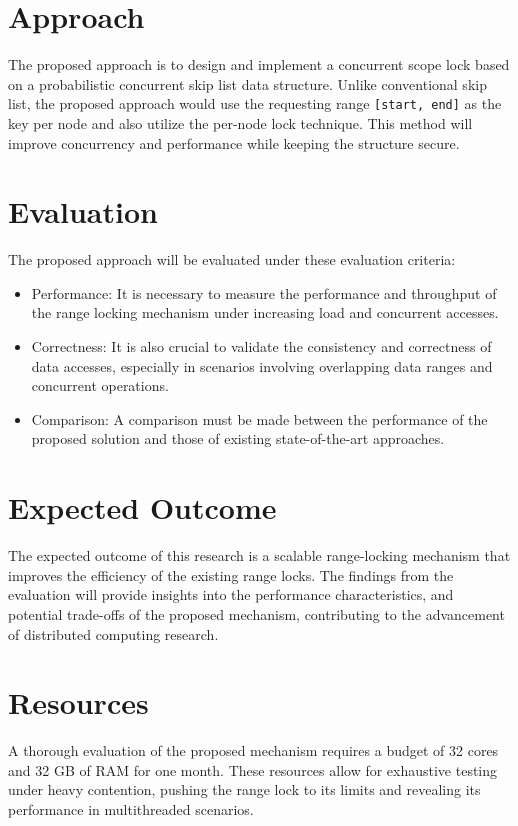 \section{Approach}
The proposed approach is to design and implement a concurrent scope lock based on a probabilistic concurrent skip list data structure. Unlike conventional skip list, the proposed approach would use the requesting range \texttt{[start, end]} as the key per node and also utilize the per-node lock technique. This method will improve concurrency and performance while keeping the structure secure.

\section{Evaluation}
The proposed approach will be evaluated under these evaluation criteria:
\begin{itemize}
    \item Performance: It is necessary to measure the performance and throughput of the range locking mechanism under increasing load and concurrent accesses.
    \item Correctness: It is also crucial to validate the consistency and correctness of data accesses, especially in scenarios involving overlapping data ranges and concurrent operations.
    \item Comparison: A comparison must be made between the performance of the proposed solution and those of existing state-of-the-art approaches.
\end{itemize}

\section{Expected Outcome}
The expected outcome of this research is a scalable range-locking mechanism that improves the efficiency of the existing range locks. The findings from the evaluation will provide insights into the performance characteristics, and potential trade-offs of the proposed mechanism, contributing to the advancement of distributed computing research.

\section{Resources}
A thorough evaluation of the proposed mechanism requires a budget of 32 cores and 32 GB of RAM for one month. These resources allow for exhaustive testing under heavy contention, pushing the range lock to its limits and revealing its performance in multithreaded scenarios.